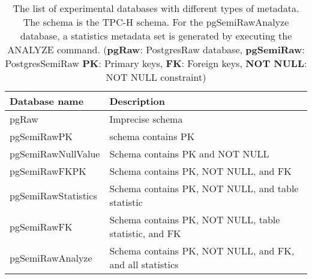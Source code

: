 \begin{table*}[h!]
\centering
\caption[The list of experimental databases]{The list of experimental databases with different types of metadata. The schema is the TPC-H schema. For the pgSemiRawAnalyze database, a statistics metadata set is generated by executing the ANALYZE command. (\textbf{pgRaw}: PostgresRaw database, \textbf{pgSemiRaw}: PostgresSemiRaw \textbf{PK}: Primary keys, \textbf{FK}: Foreign keys, \textbf{NOT NULL}: NOT NULL constraint)}
\begin{tabularx}{\textwidth}{ll}
    \toprule   
   \textbf{ Database name}&\textbf{Description}\\
    \midrule
pgRaw&Imprecise schema\\
pgSemiRawPK&schema contains PK\\
pgSemiRawNullValue&Schema contains PK and NOT NULL\\
pgSemiRawFKPK&Schema contains PK, NOT NULL, and FK\\
pgSemiRawStatistics&Schema contains PK, NOT NULL, and table statistic\\
pgSemiRawFK&Schema contains PK, NOT NULL, table statistic, and FK\\
pgSemiRawAnalyze&Schema contains PK, NOT NULL, and FK, and all statistics\\
\bottomrule
\end{tabularx}
 \label{tab:tbl-eval-db-names-list}
\end{table*}
